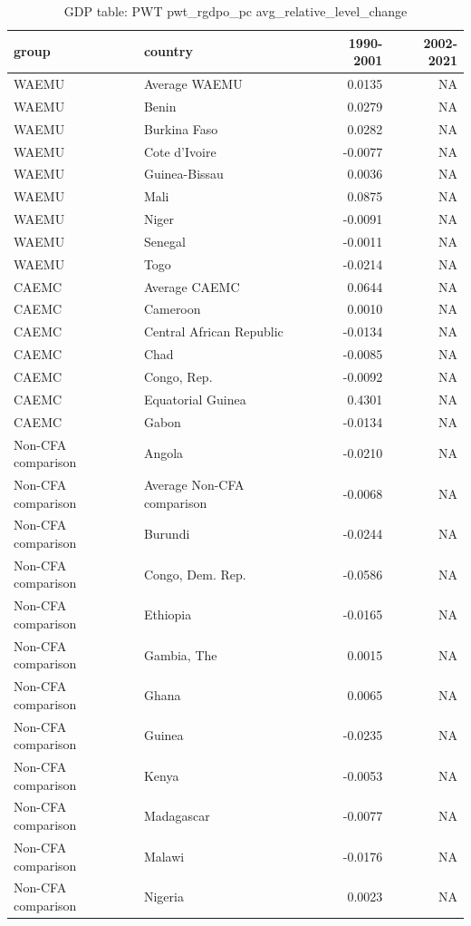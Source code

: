 \begin{table}

\caption{GDP table: PWT pwt_rgdpo_pc avg_relative_level_change}
\centering
\begin{tabular}[t]{llrr}
\toprule
group & country & 1990-2001 & 2002-2021\\
\midrule
WAEMU & Average WAEMU & 0.0135 & NA\\
WAEMU & Benin & 0.0279 & NA\\
WAEMU & Burkina Faso & 0.0282 & NA\\
WAEMU & Cote d'Ivoire & -0.0077 & NA\\
WAEMU & Guinea-Bissau & 0.0036 & NA\\
\addlinespace
WAEMU & Mali & 0.0875 & NA\\
WAEMU & Niger & -0.0091 & NA\\
WAEMU & Senegal & -0.0011 & NA\\
WAEMU & Togo & -0.0214 & NA\\
CAEMC & Average CAEMC & 0.0644 & NA\\
\addlinespace
CAEMC & Cameroon & 0.0010 & NA\\
CAEMC & Central African Republic & -0.0134 & NA\\
CAEMC & Chad & -0.0085 & NA\\
CAEMC & Congo, Rep. & -0.0092 & NA\\
CAEMC & Equatorial Guinea & 0.4301 & NA\\
\addlinespace
CAEMC & Gabon & -0.0134 & NA\\
Non-CFA comparison & Angola & -0.0210 & NA\\
Non-CFA comparison & Average Non-CFA comparison & -0.0068 & NA\\
Non-CFA comparison & Burundi & -0.0244 & NA\\
Non-CFA comparison & Congo, Dem. Rep. & -0.0586 & NA\\
\addlinespace
Non-CFA comparison & Ethiopia & -0.0165 & NA\\
Non-CFA comparison & Gambia, The & 0.0015 & NA\\
Non-CFA comparison & Ghana & 0.0065 & NA\\
Non-CFA comparison & Guinea & -0.0235 & NA\\
Non-CFA comparison & Kenya & -0.0053 & NA\\
\addlinespace
Non-CFA comparison & Madagascar & -0.0077 & NA\\
Non-CFA comparison & Malawi & -0.0176 & NA\\
Non-CFA comparison & Nigeria & 0.0023 & NA\\

\end{tabular}
\end{table}
